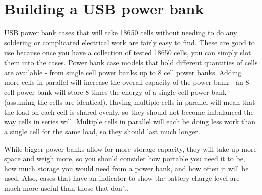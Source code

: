 \documentclass{article}
\theoremstyle{definition}
\theoremstyle{definition}
\theoremstyle{remark}
\begin{document}


\section{Building a USB power bank} %
\label{sec:building_a_usb_power_bank}

  USB power bank cases that will take 18650 cells without needing to do any soldering or complicated electrical work are fairly easy to find. These are good to use because once you have a collection of tested 18650 cells, you can simply slot them into the cases. Power bank case models that hold different quantities of cells are available - from single cell power banks up to 8 cell power banks. Adding more cells in parallel will increase the overall capacity of the power bank - an 8-cell power bank will store 8 times the energy of a single-cell power bank (assuming the cells are identical). Having multiple cells in parallel will mean that the load on each cell is shared evenly, so they should not become imbalanced the way cells in series will. Multiple cells in parallel will each be doing less work than a single cell for the same load, so they should last much longer. 

  While bigger power banks allow for more storage capacity, they will take up more space and weigh more, so you should consider how portable you need it to be, how much storage you would need from a power bank, and how often it will be used. Also, cases that have an indicator to show the battery charge level are much more useful than those that don’t. 
\end{document}

